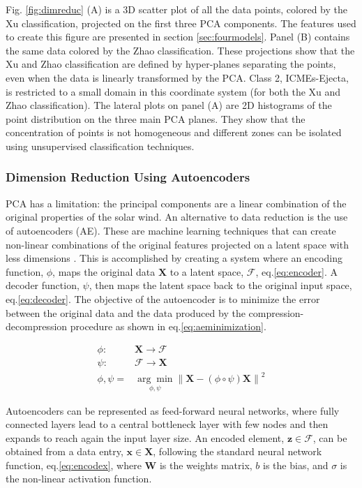 Fig. \ref{fig:dimreduc} (A) is a 3D scatter plot of all the data points, colored by the Xu classification, projected on the first three PCA components. The features used to create this figure are presented in section \ref{sec:fourmodels}. Panel (B) contains the same data colored by the Zhao classification. These projections show that the Xu and Zhao classification are defined by hyper-planes separating the points, even when the data is linearly transformed by the PCA. Class 2, ICMEs-Ejecta, is restricted to a small domain in this coordinate system (for both the Xu and Zhao classification). The lateral plots on panel (A) are 2D histograms of the point distribution on the three main PCA planes. They show that the concentration of points is not homogeneous and different zones can be isolated using unsupervised classification techniques.

\subsubsection{Dimension Reduction Using Autoencoders}
PCA has a limitation: the principal components are a linear combination of the original properties of the solar wind. An alternative to data reduction is the use of autoencoders (AE). These are machine learning techniques that can create non-linear combinations of the original features projected on a latent space with less dimensions \citep{Hinton2006}. This is accomplished by creating a system where an encoding function, $\phi$, maps the original data $\boldsymbol{X}$ to a latent space, $\boldsymbol{\mathcal{F}}$, eq.\eqref{eq:encoder}. A decoder function, $\psi$, then maps the latent space back to the original input space, eq.\eqref{eq:decoder}. The objective of the autoencoder is to minimize the error between the original data and the data produced by the compression-decompression procedure as shown in eq.\eqref{eq:aeminimization}.

\begin{align}
\phi: & \boldsymbol{X} \rightarrow \boldsymbol{\mathcal{F}} \label{eq:encoder}\\
\psi: & \boldsymbol{\mathcal{F}} \rightarrow \boldsymbol{X} \label{eq:decoder} \\
\phi,\psi = & \underset{\phi,\psi}{\arg \min} \left\lVert \boldsymbol{X} - (\phi \circ \psi) \boldsymbol{X} \right\rVert^2 \label{eq:aeminimization}
\end{align}

Autoencoders can be represented as feed-forward neural networks, where fully connected layers lead to a central bottleneck layer with few nodes and then expands to reach again the input layer size. An encoded element, $\boldsymbol{z} \in \boldsymbol{\mathcal{F}}$, can be obtained from a data entry, $\boldsymbol{x} \in \boldsymbol{X}$, following the standard neural network function, eq.\eqref{eq:encodex}, where $\boldsymbol{W}$ is the weights matrix, $b$ is the bias, and $\sigma$ is the non-linear activation function.

